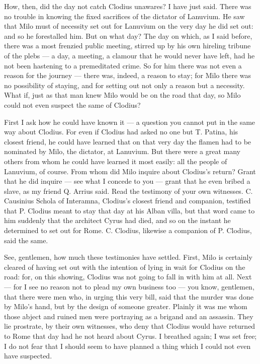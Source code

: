  How, then, did the day not catch Clodius unawares? I have just said. There was no trouble in knowing the fixed sacrifices of the dictator of Lanuvium. He saw that Milo must of necessity set out for Lanuvium on the very day he did set out: and so he forestalled him. But on what day? The day on which, as I said before, there was a most frenzied public meeting, stirred up by his own hireling tribune of the plebs --- a day, a meeting, a clamour that he would never have left, had he not been hastening to a premeditated crime. So for him there was not even a reason for the journey --- there was, indeed, a reason to stay; for Milo there was no possibility of staying, and for setting out not only a reason but a necessity. What if, just as that man knew Milo would be on the road that day, so Milo could not even suspect the same of Clodius?

 First I ask how he could have known it --- a question you cannot put in the same way about Clodius. For even if Clodius had asked no one but T. Patina, his closest friend, he could have learned that on that very day the flamen had to be nominated by Milo, the dictator, at Lanuvium. But there were a great many others from whom he could have learned it most easily: all the people of Lanuvium, of course. From whom did Milo inquire about Clodius's return? Grant that he did inquire --- see what I concede to you --- grant that he even bribed a slave, as my friend Q. Arrius said. Read the testimony of your own witnesses. C. Causinius Schola of Interamna, Clodius's closest friend and companion, testified that P. Clodius meant to stay that day at his Alban villa, but that word came to him suddenly that the architect Cyrus had died, and so on the instant he determined to set out for Rome. C. Clodius, likewise a companion of P. Clodius, said the same.

 See, gentlemen, how much these testimonies have settled. First, Milo is certainly cleared of having set out with the intention of lying in wait for Clodius on the road: for, on this showing, Clodius was not going to fall in with him at all. Next --- for I see no reason not to plead my own business too --- you know, gentlemen, that there were men who, in urging this very bill, said that the murder was done by Milo's hand, but by the design of someone greater. Plainly it was me whom those abject and ruined men were portraying as a brigand and an assassin. They lie prostrate, by their own witnesses, who deny that Clodius would have returned to Rome that day had he not heard about Cyrus. I breathed again; I was set free; I do not fear that I should seem to have planned a thing which I could not even have suspected.

